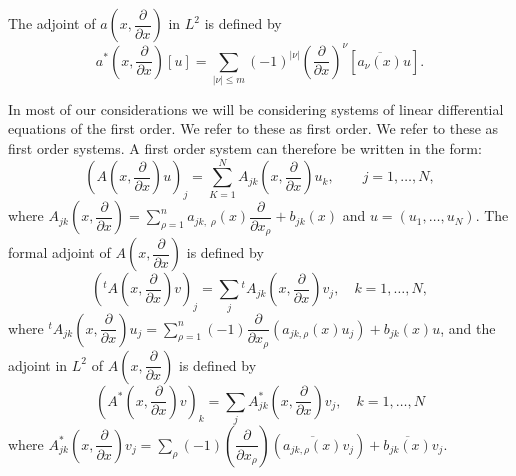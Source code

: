 The adjoint of $a \left(x,  \dfrac {\partial}{\partial x} \right)$ in
$L^2$ is defined by 
\begin{equation}
a^* \left(x,  \frac{\partial}{\partial x}\right) [u] = \sum _{|\nu | \leq
  m}(-1)^{|\nu|}\left(\frac{\partial}{\partial
  x}\right)^{\nu}[\overline{a_{\nu}(x)}u]. \tag{1.3}  \label{chap1-eq1.3}
\end{equation}

In most of our considerations we will be considering systems of linear
differential equations of the first order. We refer to these as first
order. We refer to these as first order systems. A first order system
can therefore be written in the form: 
\begin{equation}
\left(A \left(x, \frac{\partial}{\partial x}\right)u\right)_j 
  = \sum^{N}_{K=1} A_{jk}\left(x,
  \frac{\partial}{\partial x}\right)u_{k},\qquad j=1, \ldots ,  N,
  \tag{$1.1'$} 
\end{equation}
where $A_{jk}\left(x, \dfrac{\partial}{\partial x}\right)=\sum\limits
^{n}_{\rho=1} 
a_{jk, \;  \rho} (x) \dfrac{\partial}{\partial x_{\rho}} +b_{jk}(x)$ and
$u= (u_1, \ldots,  u_N)$. The formal adjoint of $A \left(x,
\dfrac{\partial}{\partial x}\right)$ is defined by 
\begin{equation}
\left(^t A\left(x,  \frac{\partial}{\partial x}\right) v\right)_j =
\sum\limits_j{^t}  A_{jk} \left(x, 
  \frac{\partial}{\partial x}\right)v_j,\quad k=1, \ldots , N,
  \tag{$1.2'$}  
\end{equation}
where $^t A_{jk} \left(x, \dfrac{\partial}{\partial x}\right)u_j = \sum 
^{n}_{\rho=1} (-1) \dfrac{\partial} {\partial x_\rho}(a_{jk,  \rho}
(x) u_j) +  b_{jk}(x)u$, and the adjoint in $L^2$ of $A \left(x,  \dfrac
{\partial}{\partial x}\right)$ is defined by 
\begin{equation}
\left(A^*\left(x,  \frac{\partial}{\partial x}\right)v\right)_k =
\sum\limits_j A^*_{jk} \left(x, 
  \frac{\partial} {\partial x}\right) v_j,  \quad k=1,  \ldots ,  N
  \tag{$1.3'$}  
\end{equation}
where $A^*_{jk} \left(x,  \dfrac{\partial}{\partial x} \right)v_j =
\sum\limits_{\rho} (-1) ( \dfrac{\partial}{\partial x_{\rho}})
(\overline{a_{jk, \rho}   (x)} v_j ) + \overline{b_{jk}(x) }{v_j}$.   


